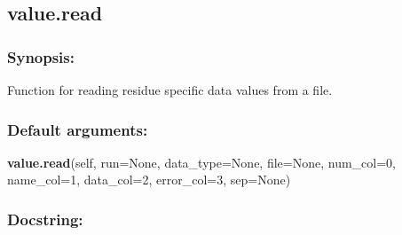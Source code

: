 \newpage

\subsection{value.read}


\subsubsection{Synopsis:}

Function for reading residue specific data values from a file.

\subsubsection{Default arguments:}

\textsf{\textbf{value.read}(self, run=None, data\_type=None, file=None, num\_col=0, name\_col=1, data\_col=2, error\_col=3, sep=None)
}


\subsubsection{Docstring:}

